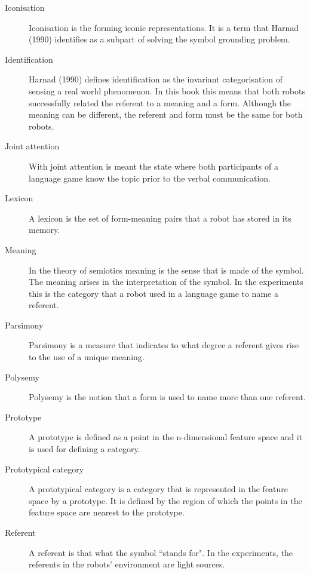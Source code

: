 \begin{description}
\item[Iconisation] Iconisation is the forming iconic representations. It is a term that Harnad (1990) identifies as a subpart of solving the symbol grounding problem.

\item[Identification]  Harnad (1990) defines identification as the invariant categorisation of sensing a real world phenomenon. In this book this means that both robots successfully related the referent to a meaning and a form. Although the meaning can be different, the referent and form must be the same for both robots.

\item[Joint attention] With joint attention is meant the state where both participants of a language game know the topic prior to the verbal communication.

\item[Lexicon] A lexicon is the set of form-meaning pairs that a robot has stored in its memory.

\item[Meaning] In the theory of semiotics meaning is the sense that is made of the symbol. The meaning arises in the interpretation of the symbol. In the experiments this is the category that a robot used in a language game to name a referent.

\item[Parsimony] Parsimony is a measure that indicates to what degree a referent gives rise to the use of a unique meaning.

\item[Polysemy] Polysemy is the notion that a form is used to name more than one referent.

\item[Prototype] A prototype is defined as a point in the n-dimensional feature space and it is used for defining a category.

\item[Prototypical category] A prototypical category is a category that is represented in the feature space by a prototype. It is defined by the region of which the points in the feature space are nearest to the prototype.

\item[Referent] A referent is that what the symbol ``stands for". In the experiments, the referents in the robots' environment are light sources.


\end{description}
